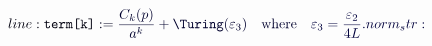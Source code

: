 \documentclass[12pt]{article}
\begin{document}
\makeatletter
\renewcommand*{\@textcolor}[3]{%
  \protect\leavevmode
  \begingroup
    \color#1{#2}#3%
  \endgroup
}
\makeatother
\begin{displaymath}
\mathcolor[RGB]{0,0,15}{line:
\texttt{term[k]}} \mathcolor[RGB]{0,0,30}{:=} \mathcolor[RGB]{0,0,45}{\frac{C_k(p)}{a^k}+\Turing(\varepsilon_3)\quad\text{where}\quad} \mathcolor[RGB]{0,0,60}{\varepsilon_3=\frac{\varepsilon_2}{4L}.

norm_str:}
\end{displaymath}
\end{document}
